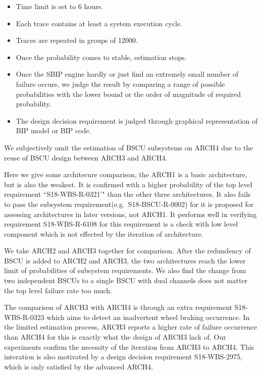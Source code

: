 \begin{itemize}
	\item Time limit is set to 6 hours.
	\item Each trace contains at least a system execution cycle.
	\item Traces are repeated in groups of 12000.
	\item Once the probability comes to stable, estimation stops.
	\item Once the SBIP engine hardly or just find an extremely small number of failure occurs, we judge the result by comparing a range of possible probabilities with the lower bound or the order of magnitude of required probability.  
	\item The design decision requirement is judged through graphical representation of BIP model or BIP code.
\end{itemize}

We subjectively omit the estimation of BSCU subsystems on ARCH4 due to the reuse of BSCU design between ARCH3 and ARCH4.

Here we give some architecure comparison, the ARCH1 is a basic architecture, but is also the weakest. It is confirmed with a higher probability of the top level requirement ``S18-WBS-R-0321'" than the other three architectures. It also fails to pass the subsystem requirement(e.g.\ S18-BSCU-R-0002) for it is proposed for assessing architectures in later versions, not ARCH1. It performs well in verifying requirement S18-WBS-R-6108 for this requirement is a check with low level component which is not effected by the iteration of architecture.

We take ARCH2 and ARCH3 together for comparison. After the redundency of BSCU is added to ARCH2 and ARCH3, the two architectures reach the lower limit of probabilities of subsystem requirements. We also find the change from two independent BSCUs to a single BSCU with dual channels does not matter the top level failure rate too much.

The comparison of ARCH3 with ARCH4 is through an extra requirement S18-WBS-R-0323 which aims to detect an inadvertent wheel braking occurrence. In the limited estimation process, ARCH3 reports a higher rate of failure occurrence than ARCH4 for this is exactly what the design of ARCH3 lack of. Our experiments confirm the necessity of the iteration from ARCH3 to ARCH4. This interation is also motivated by a design decision requirement S18-WBS-2975, which is only satisfied by the advanced ARCH4. 

